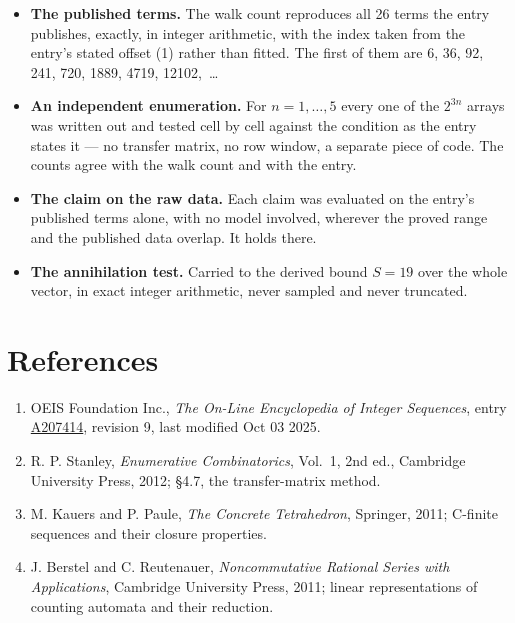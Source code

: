 \documentclass[11pt]{article}
\theoremstyle{definition}
\begin{document}
\begin{itemize}

\item {\bfseries The published terms.} The walk count reproduces all 26 terms the entry publishes, exactly, in integer arithmetic, with the index taken from the entry's stated offset (1) rather than fitted. The first of them are 6, 36, 92, 241, 720, 1889, 4719, 12102,~\dots

\item {\bfseries An independent enumeration.} For $n = 1,\dots,5$ every one of the $2^{3n}$ arrays was written out and tested cell by cell against the condition as the entry states it --- no transfer matrix, no row window, a separate piece of code. The counts agree with the walk count and with the entry.

\item {\bfseries The claim on the raw data.} Each claim was evaluated on the entry's published terms alone, with no model involved, wherever the proved range and the published data overlap. It holds there.

\item {\bfseries The annihilation test.} Carried to the derived bound $S = 19$ over the whole vector, in exact integer arithmetic, never sampled and never truncated.

\end{itemize}

\section{References}

\begin{enumerate}

\item OEIS Foundation Inc., \emph{The On-Line Encyclopedia of Integer Sequences}, entry \href{https://oeis.org/A207414}{A207414}, revision 9, last modified Oct 03 2025.

\item R. P. Stanley, \emph{Enumerative Combinatorics}, Vol.~1, 2nd ed., Cambridge University Press, 2012; \S4.7, the transfer-matrix method.

\item M. Kauers and P. Paule, \emph{The Concrete Tetrahedron}, Springer, 2011; C-finite sequences and their closure properties.

\item J. Berstel and C. Reutenauer, \emph{Noncommutative Rational Series with Applications}, Cambridge University Press, 2011; linear representations of counting automata and their reduction.

\end{enumerate}
\end{document}
